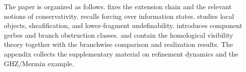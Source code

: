 The paper is organized as follows.  fixes the extension chain and the relevant notions of conservativity.  recalls forcing over information states.  studies local objects, sheafification, and lower-fragment undefinability.  introduces component gerbes and branch obstruction classes.  and  contain the homological visibility theory together with the branchwise comparison and realization results. The appendix collects the supplementary material on refinement dynamics and the GHZ/Mermin example.
